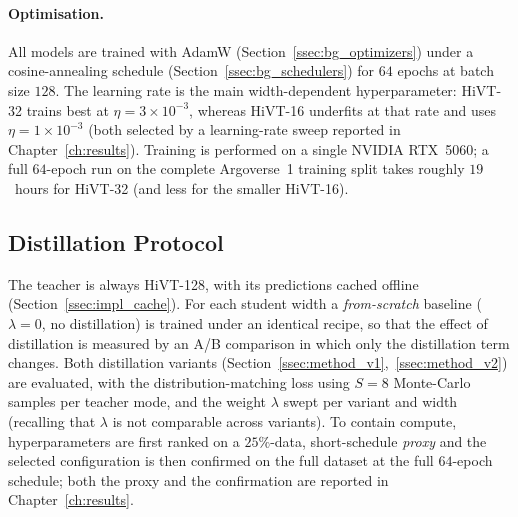 \paragraph{Optimisation.}
All models are trained with AdamW (Section~\ref{ssec:bg_optimizers}) under a
cosine-annealing schedule (Section~\ref{ssec:bg_schedulers}) for $64$ epochs at
batch size $128$. The learning rate is the main width-dependent hyperparameter:
HiVT-32 trains best at $\eta=3\times10^{-3}$, whereas HiVT-16 underfits at that
rate and uses $\eta=1\times10^{-3}$ (both selected by a learning-rate sweep
reported in Chapter~\ref{ch:results}). Training is performed on a single NVIDIA
RTX~5060; a full $64$-epoch run on the complete Argoverse~1 training split takes
roughly $19$~hours for HiVT-32 (and less for the smaller HiVT-16).

\subsection{Distillation Protocol}
\label{ssec:setup_kd}
The teacher is always HiVT-128, with its predictions cached offline
(Section~\ref{ssec:impl_cache}). For each student width a \emph{from-scratch}
baseline ($\lambda=0$, no distillation) is trained under an identical recipe, so
that the effect of distillation is measured by an A/B comparison in which only the
distillation term changes. Both distillation variants
(Section~\ref{ssec:method_v1},~\ref{ssec:method_v2}) are evaluated, with the
distribution-matching loss using $S=8$ Monte-Carlo samples per teacher mode, and
the weight $\lambda$ swept per variant and width (recalling that $\lambda$ is not
comparable across variants). To contain compute, hyperparameters are first ranked
on a $25\%$-data, short-schedule \emph{proxy} and the selected configuration is
then confirmed on the full dataset at the full $64$-epoch schedule; both the proxy
and the confirmation are reported in Chapter~\ref{ch:results}.
